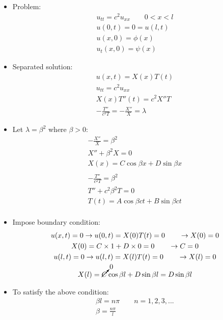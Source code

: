 \documentclass[12pt, a4paper]{article}
\begin{document}
\begin{itemize}
    \item Problem:
    \begin{gather*}
        u_{tt} = c^2u_{xx} \qquad 0<x<l\\
        u(0, t) = 0 = u(l, t)\\
        u(x, 0) = \phi(x)\\
        u_t(x, 0) = \psi(x)
    \end{gather*}
    \item Separated solution:
    \begin{gather*}
        u(x, t) = X(x)T(t)\\
        u_{tt} = c^2u_{xx}\\
        X(x)T''(t) = c^2X''T\\
        -\frac{T''}{c^2T}=-\frac{X''}{X} = \lambda
    \end{gather*}
    \item Let $\lambda = \beta^2$ where $\beta >0$:
    \begin{gather*}
        -\frac{X''}{X} = \beta^2\\
        X'' + \beta^2X = 0\\
        X(x) = C\cos{\beta x} + D\sin{\beta x}\\\\
        -\frac{T''}{c^2T}= \beta^2\\
        T'' + c^2\beta^2T = 0\\
        T(t) = A\cos{\beta ct} + B\sin{\beta ct}\\
    \end{gather*} 
    \item Impose boundary condition:
    \begin{gather*}
        u(x, t) = 0 \rightarrow u(0, t) = X(0)T(t) = 0 \qquad\rightarrow X(0) = 0\\
        X(0) = C\times 1 + D\times 0 = 0 \qquad\rightarrow C = 0\\
        u(l, t) = 0 \rightarrow u(l, t) = X(l)T(t) = 0 \qquad\rightarrow X(l) = 0\\
        X(l) = \cancelto{0}{C}\cos{\beta l} + D\sin{\beta l} = D\sin{\beta l}\\
    \end{gather*}
    \item To satisfy the above condition:
    \begin{gather*}
        \beta l = n\pi \qquad n = 1, 2, 3, ...\\
        \beta = \frac{n\pi}{l}\\

\end{gather*}
\end{itemize}
\end{document}
